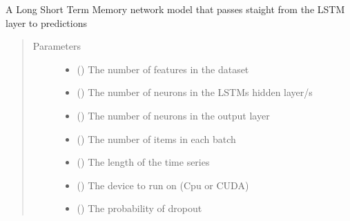 \documentclass[letterpaper,10pt,english]{sphinxmanual}
\begin{document}

\begin{fulllineitems}
\label{\detokenize{models:Foresight.models.LSTM_shallow}}
A Long Short Term Memory network model that passes staight
from the LSTM layer to predictions
\begin{quote}\begin{description}
\item[{Parameters}] \leavevmode\begin{itemize}
\item {} 
 () \textendash{} The number of features in the dataset

\item {} 
 () \textendash{} The number of neurons in the LSTMs hidden layer/s

\item {} 
 () \textendash{} The number of neurons in the output layer

\item {} 
 () \textendash{} The number of items in each batch

\item {} 
 () \textendash{} The length of the time series

\item {} 
 () \textendash{} The device to run on (Cpu or CUDA)

\item {} 
 () \textendash{} The probability of dropout


\end{itemize}
\end{description}
\end{quote}
\end{fulllineitems}
\end{document}

